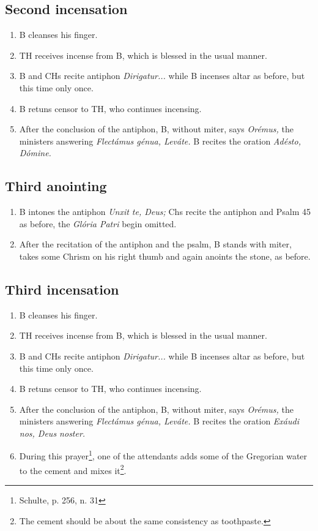 \documentclass[letterpaper, twocolumn]{article}
\begin{document}
\subsection*{Second incensation}
\begin{enumerate}
	\item B cleanses his finger.
	\item TH receives incense from B, which is blessed in the usual manner.
	\item B and CHs recite antiphon \textit{Dirigatur...} while B incenses altar as before, but this time only once.
	\item B retuns censor to TH, who continues incensing.
	\item After the conclusion of the antiphon, B, without miter, says \textit{Orémus,} the ministers answering \textit{Flectámus génua, Leváte.} B recites the oration \textit{Adésto, Dómine.}
\end{enumerate}
\subsection*{Third anointing}
\begin{enumerate}
	\item B intones the antiphon \textit{Unxit te, Deus;} Chs recite the antiphon and Psalm 45 as before, the \textit{Glória Patri} begin omitted.
	\item After the recitation of the antiphon and the psalm, B stands with miter, takes some Chrism on his right thumb and again anoints the stone, as before.
\end{enumerate}
\subsection*{Third incensation}
\begin{enumerate}
	\item B cleanses his finger.
	\item TH receives incense from B, which is blessed in the usual manner.
	\item B and CHs recite antiphon \textit{Dirigatur...} while B incenses altar as before, but this time only once.
	\item B retuns censor to TH, who continues incensing.
	\item After the conclusion of the antiphon, B, without miter, says \textit{Orémus,} the ministers answering \textit{Flectámus génua, Leváte.} B recites the oration \textit{Exáudi nos, Deus noster.}
	\item During this prayer\footnote{Schulte, p. 256, n. 31}, one of the attendants adds some of the Gregorian water to the cement and mixes it\footnote{The cement should be about the same consistency as toothpaste.}.
\end{enumerate}
\end{document}
